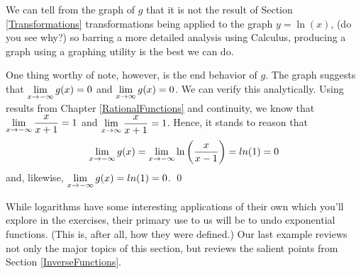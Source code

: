 \documentclass{ximera}
\begin{document}
\begin{ex}
\begin{enumerate}
\begin{center}
\begin{multicols}{2}
\end{multicols}

\end{center}

  We can tell from the graph of $g$ that it is not the result of Section \ref{Transformations} transformations being applied to the graph $y = \ln(x)$, (do you see why?)  so barring a more detailed analysis using Calculus, producing a graph using a graphing utility is the best we can do.  
  
  \smallskip

One thing worthy of note, however, is the end behavior of $g$.  The graph suggests that $\ds{\lim_{x \rightarrow -\infty} g(x) = 0}$ and  $\ds{\lim_{x \rightarrow \infty} g(x) = 0}$.  We can verify this analytically.  Using results  from Chapter \ref{RationalFunctions} and continuity, we know that $\ds{\lim_{x \rightarrow -\infty} \frac{x}{x+1} = 1}$ and  $\ds{\lim_{x \rightarrow \infty} \frac{x}{x+1} = 1}$.  Hence, it stands to reason that \[\ds{\lim_{x \rightarrow -\infty} g(x) = \lim_{x \rightarrow -\infty}  \ln \left(\frac{x}{x-1}\right) = ln(1) = 0}\] and, likewise,  $\ds{\lim_{x \rightarrow -\infty} g(x) = ln(1) = 0}$.  \qed

\end{enumerate}

\end{ex}

While logarithms have some interesting applications of their own which you'll explore in the exercises, their primary use to us will be to undo exponential functions. (This is, after all, how they were defined.)  Our last example  reviews not only the major topics of this section, but reviews the salient points from Section \ref{InverseFunctions}.

\newpage
\end{document}
